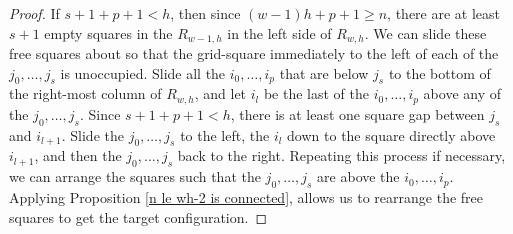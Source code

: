 \documentclass[10pt,a4paper]{amsart}
\begin{document}
\begin{proof}
If $s+1+p+1<h$, then since $(w-1)h+p+1\ge n$, there are at least $s+1$ empty squares in the $R_{w-1,h}$ in the left side of $R_{w,h}$. 
We can slide these free squares about so that the grid-square immediately to the left of each of the $j_{0},\dots, j_{s}$ is unoccupied.
Slide all the $i_{0},\dots, i_{p}$ that are below $j_{s}$ to the bottom of the right-most column of $R_{w,h}$, and let $i_{l}$ be the last of the $i_{0},\dots, i_{p}$ above any of the $j_{0}, \dots, j_{s}$.
Since $s+1+p+1<h$, there is at least one square gap between $j_{s}$ and $i_{l+1}$.
Slide the $j_{0}, \dots, j_{s}$ to the left, the $i_{l}$ down to the square directly above $i_{l+1}$, and then the $j_{0}, \dots, j_{s}$ back to the right.
Repeating this process if necessary, we can arrange the squares such that the $j_{0},\dots, j_{s}$ are above the $i_{0}, \dots, i_{p}$.
Applying Proposition \ref{n le wh-2 is connected}, allows us to rearrange the free squares to get the target configuration.
\end{proof}
\end{document}
